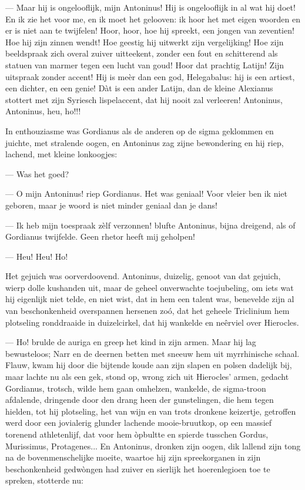 \documentclass[a4paper, 12pt, oneside, dutch]{article}
\begin{document}
--- Maar hij is ongelooflijk, mijn Antoninus! Hij is ongelooflijk in al wat hij doet! En ik zie het voor me, en ik moet het gelooven: ik hoor het met eigen woorden en er is niet aan te twijfelen! Hoor, hoor, hoe hij spreekt, een jongen van zeventien! Hoe hij zijn zinnen wendt! Hoe geestig hij uitwerkt zijn vergelijking! Hoe zijn beeldspraak zich overal zuiver uitteekent, zonder een fout en schitterend als statuen van marmer tegen een lucht van goud! Hoor dat prachtig Latijn! Zijn uitspraak zonder accent! Hij is meèr dan een god, Helegabalus: hij is een artiest, een dichter, en een genie! Dàt is een ander Latijn, dan de kleine Alexianus stottert met zijn Syriesch lispelaccent, dat hij nooit zal verleeren! Antoninus, Antoninus, heu, ho!!!

In enthouziasme was Gordianus als de anderen op de sigma geklommen en juichte, met stralende oogen, en Antoninus zag zijne bewondering en hij riep, lachend, met kleine lonkoogjes:

--- Was het goed?

--- O mijn Antoninus! riep Gordianus. Het was geniaal! Voor vleier ben ik niet geboren, maar je woord is niet minder geniaal dan je dans!

--- Ik heb mijn toespraak zèlf verzonnen! blufte Antoninus, bijna dreigend, als of Gordianus twijfelde. Geen rhetor heeft mij geholpen!

--- Heu! Heu! Ho!

Het gejuich was oorverdoovend. Antoninus, duizelig, genoot van dat gejuich, wierp dolle kushanden uit, maar de geheel onverwachte toejubeling, om iets wat hij eigenlijk niet telde, en niet wist, dat in hem een talent was, benevelde zijn al van beschonkenheid overspannen hersenen zoó, dat het geheele Triclinium hem plotseling ronddraaide in duizelcirkel, dat hij wankelde en neêrviel over Hierocles.

--- Ho! brulde de auriga en greep het kind in zijn armen. Maar hij lag bewusteloos; Narr en de deernen betten met sneeuw hem uit myrrhinische schaal. Flauw, kwam hij door die bijtende koude aan zijn slapen en polsen dadelijk bij, maar lachte nu als een gek, stond op, wrong zich uit Hierocles' armen, gedacht Gordianus, trotsch, wilde hem gaan omhelzen, wankelde, de sigma-troon afdalende, dringende door den drang heen der gunstelingen, die hem tegen hielden, tot hij plotseling, het van wijn en van trots dronkene keizertje, getroffen werd door een jovialerig glunder lachende mooie-bruutkop, op een massief torenend athletenlijf, dat voor hem òpbultte en spierde tusschen Gordus, Murissimus, Protagenes... En Antoninus, dronken zijn oogen, dik lallend zijn tong na de bovenmenschelijke moeite, waartoe hij zijn spreekorganen in zijn beschonkenheid gedwòngen had zuiver en sierlijk het hoerenlegioen toe te spreken, stotterde nu:
\end{document}
